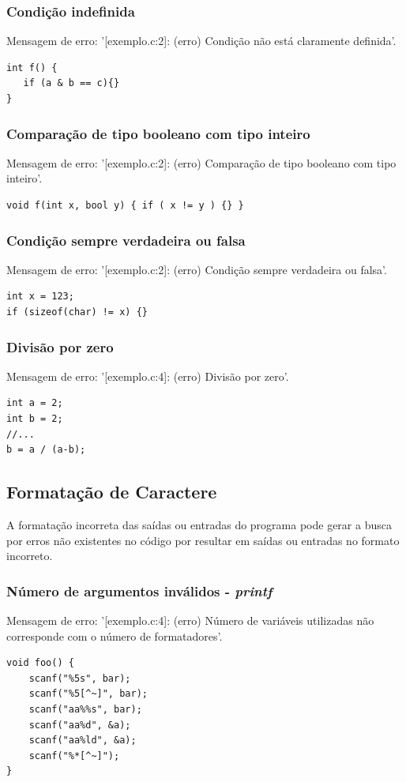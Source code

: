 \documentclass[12pt,a4paper]{report}
\begin{document}
\subsubsection{Condição indefinida}
Mensagem de erro: '[exemplo.c:2]: (erro) Condição não está claramente definida'.
\begin{lstlisting}[style=CStyle]
int f() {
   if (a & b == c){}
}
\end{lstlisting}

\subsubsection{Comparação de tipo booleano com tipo inteiro}
Mensagem de erro: '[exemplo.c:2]: (erro) Comparação de tipo booleano com tipo inteiro'.
\begin{lstlisting}[style=CStyle]
void f(int x, bool y) { if ( x != y ) {} }
\end{lstlisting}

\subsubsection{Condição sempre verdadeira ou falsa}

Mensagem de erro: '[exemplo.c:2]: (erro) Condição sempre verdadeira ou falsa'.
\begin{lstlisting}[style=CStyle]
int x = 123;
if (sizeof(char) != x) {}
\end{lstlisting}

\subsubsection{Divisão por zero}
Mensagem de erro: '[exemplo.c:4]: (erro) Divisão por zero'.
\begin{lstlisting}[style=CStyle]
int a = 2;
int b = 2;
//...
b = a / (a-b);
\end{lstlisting}

\subsection{Formatação de Caractere}
A formatação incorreta das saídas ou entradas do programa pode gerar a busca por erros não existentes no código por resultar em saídas ou entradas no formato incorreto.
\subsubsection{Número de argumentos inválidos - \textit{printf}}
Mensagem de erro: '[exemplo.c:4]: (erro) Número de variáveis utilizadas não corresponde com o número de formatadores'.
\begin{lstlisting}[style=CStyle]
void foo() {
    scanf("%5s", bar);
    scanf("%5[^~]", bar);
    scanf("aa%%s", bar);
    scanf("aa%d", &a);
    scanf("aa%ld", &a);
    scanf("%*[^~]");
}
\end{lstlisting}
\end{document}
